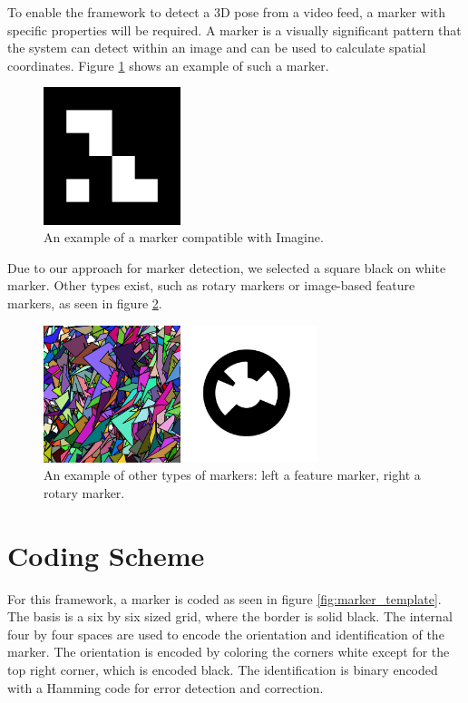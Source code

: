 \label{section_markers}

To enable the framework to detect a 3D pose from a video feed, a marker with specific properties will be required.
A marker is a visually significant pattern that the system can detect within an image and can be used to calculate spatial coordinates.
Figure \ref{fig:marker_example} shows an example of such a marker.

\begin{figure}[H]
	\centering
	\includegraphics[width=4cm]{img/marker_example.png}
	\caption[Example Marker.]{An example of a marker compatible with Imagine.}
	\label{fig:marker_example}
\end{figure}

Due to our approach for marker detection, we selected a square black on white marker.
Other types exist, such as rotary markers or image-based feature markers, as seen in figure \ref{fig:marker_alt}.

\begin{figure}[H]
	\centering
	\includegraphics[width=8cm]{img/marker_alternatives.png}
	\caption[Alternative Marker Types.]{An example of other types of markers: left a feature marker, right a rotary marker.}
	\label{fig:marker_alt}
\end{figure}

\section{Coding Scheme}

For this framework, a marker is coded as seen in figure \ref{fig:marker_template}.
The basis is a six by six sized grid, where the border is solid black.
The internal four by four spaces are used to encode the orientation and identification of the marker.
The orientation is encoded by coloring the corners white except for the top right corner, which is encoded black.
The identification is binary encoded with a Hamming code \cite{hamming} for error detection and correction.

